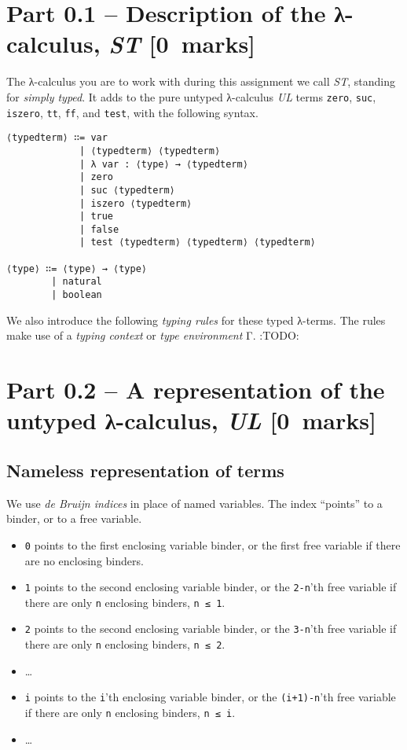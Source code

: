 \documentclass[11pt]{article}
\begin{document}
\section*{Part 0.1 – Description of the λ-calculus, \emph{ST}                 [0 marks]}
\label{sec:org3af55d5}
The λ-calculus you are to work with during this assignment
we call \emph{ST}, standing for \emph{simply typed}.
It adds to the pure untyped λ-calculus \emph{UL}
terms \texttt{zero}, \texttt{suc}, \texttt{iszero}, \texttt{tt}, \texttt{ff}, and \texttt{test}, with the following syntax.
\begin{verbatim}
⟨typedterm⟩ ∷= var
             | ⟨typedterm⟩ ⟨typedterm⟩
             | λ var : ⟨type⟩ → ⟨typedterm⟩
             | zero
             | suc ⟨typedterm⟩
             | iszero ⟨typedterm⟩
             | true
             | false
             | test ⟨typedterm⟩ ⟨typedterm⟩ ⟨typedterm⟩

⟨type⟩ ∷= ⟨type⟩ → ⟨type⟩
        | natural
        | boolean
\end{verbatim}

We also introduce the following \emph{typing rules} for these typed λ-terms.
The rules make use of a \emph{typing context} or \emph{type environment} Γ.
:TODO:

\section*{Part 0.2 – A representation of the untyped λ-calculus, \emph{UL}    [0 marks]}
\label{sec:orgfac408e}
\subsection*{Nameless representation of terms}
\label{sec:org24d3017}
We use \emph{de Bruijn indices} in place of named variables.
The index “points” to a binder, or to a free variable.
\begin{itemize}
\item \texttt{0} points to the first enclosing variable binder,
or the first free variable if there are no enclosing binders.
\item \texttt{1} points to the second enclosing variable binder,
or the \texttt{2-n}'th free variable if there are only \texttt{n} enclosing binders, \texttt{n ≤ 1}.
\item \texttt{2} points to the second enclosing variable binder,
or the \texttt{3-n}'th free variable if there are only \texttt{n} enclosing binders, \texttt{n ≤ 2}.
\item …
\item \texttt{i} points to the \texttt{i}'th enclosing variable binder,
or the \texttt{(i+1)-n}'th free variable if there are only \texttt{n} enclosing binders, \texttt{n ≤ i}.
\item …
\end{itemize}
\end{document}
